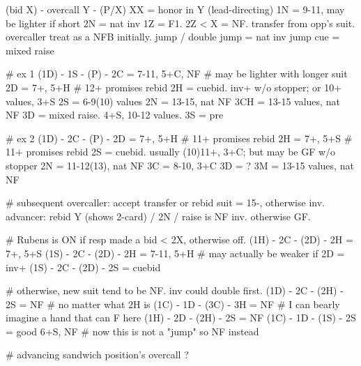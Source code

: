 (bid X) - overcall Y - (P/X)
XX = honor in Y (lead-directing)
1N = 9-11, may be lighter if short
2N = nat inv
1Z = F1. 2Z < X = NF.
transfer from opp's suit. overcaller treat as a NFB initially.
jump / double jump = nat inv
jump cue = mixed raise

# ex 1
(1D) - 1S - (P) -
2C = 7-11, 5+C, NF  # may be lighter with longer suit
2D = 7+, 5+H  # 12+ promises rebid
2H = cuebid. inv+ w/o stopper; or 10+ values, 3+S
2S = 6-9(10) values
2N = 13-15, nat NF
3CH = 13-15 values, nat NF
3D = mixed raise. 4+S, 10-12 values.
3S = pre

# ex 2
(1D) - 2C - (P) -
2D = 7+, 5+H  # 11+ promises rebid
2H = 7+, 5+S  # 11+ promises rebid
2S = cuebid. usually (10)11+, 3+C; but may be GF w/o stopper
2N = 11-12(13), nat NF
3C = 8-10, 3+C
3D = ?
3M = 13-15 values, nat NF

# subsequent
overcaller: accept transfer or rebid suit = 15-, otherwise inv.
advancer: rebid Y (shows 2-card) / 2N / raise is NF inv. otherwise GF.

# Rubens is ON if resp made a bid < 2X, otherwise off.
(1H) - 2C - (2D) - 2H = 7+, 5+S
(1S) - 2C - (2D) - 2H = 7-11, 5+H  # may actually be weaker if 2D = inv+
(1S) - 2C - (2D) - 2S = cuebid

# otherwise, new suit tend to be NF. inv could double first.
(1D) - 2C - (2H) - 2S = NF  # no matter what 2H is
(1C) - 1D - (3C) - 3H = NF  # I can bearly imagine a hand that can F here
(1H) - 2D - (2H) - 2S = NF
(1C) - 1D - (1S) - 2S = good 6+S, NF  # now this is not a "jump" so NF instead

# advancing sandwich position's overcall ?